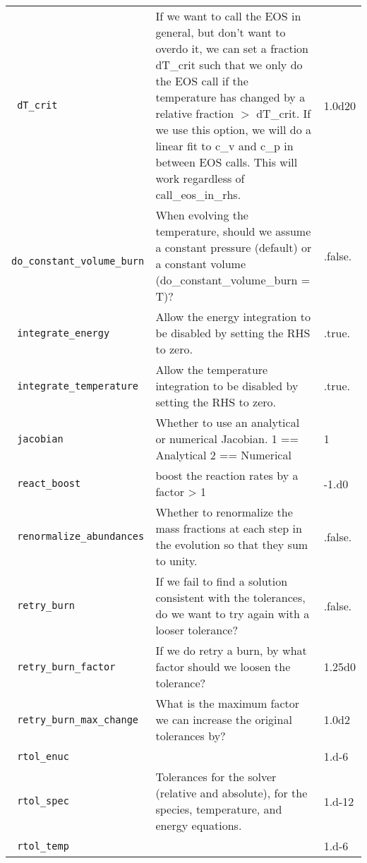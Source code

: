 \begin{landscape}
{\begin{center}
\begin{longtable}{|l|p{5.25in}|l|}
\rowcolor{tableShade}
\verb= dT_crit = &  If we want to call the EOS in general, but don't want to overdo it, we can set a fraction dT\_crit such that we only do the EOS call if the temperature has changed by a relative fraction $>$ dT\_crit. If we use this option, we will do a linear fit to c\_v and c\_p in between EOS calls. This will work regardless of call\_eos\_in\_rhs. & 1.0d20 \\
\verb= do_constant_volume_burn = &  When evolving the temperature, should we assume a constant pressure (default) or a constant volume (do\_constant\_volume\_burn = T)? & .false. \\
\rowcolor{tableShade}
\verb= integrate_energy = &  Allow the energy integration to be disabled by setting the RHS to zero. & .true. \\
\verb= integrate_temperature = &  Allow the temperature integration to be disabled by setting the RHS to zero. & .true. \\
\rowcolor{tableShade}
\verb= jacobian = &  Whether to use an analytical or numerical Jacobian. 1 == Analytical 2 == Numerical & 1 \\
\verb= react_boost = &  boost the reaction rates by a factor > 1 & -1.d0 \\
\rowcolor{tableShade}
\verb= renormalize_abundances = &  Whether to renormalize the mass fractions at each step in the evolution so that they sum to unity. & .false. \\
\verb= retry_burn = &  If we fail to find a solution consistent with the tolerances, do we want to try again with a looser tolerance? & .false. \\
\rowcolor{tableShade}
\verb= retry_burn_factor = &  If we do retry a burn, by what factor should we loosen the tolerance? & 1.25d0 \\
\verb= retry_burn_max_change = &  What is the maximum factor we can increase the original tolerances by? & 1.0d2 \\
\rowcolor{tableShade}
\verb= rtol_enuc = &  & 1.d-6 \\
\verb= rtol_spec = &  Tolerances for the solver (relative and absolute), for the species, temperature, and energy equations. & 1.d-12 \\
\rowcolor{tableShade}
\verb= rtol_temp = &  & 1.d-6 \\


\end{longtable}
\end{center}

} %



\end{landscape}
